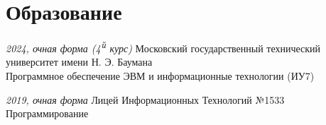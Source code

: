 \section*{Образование}

\aside
{\textit{2024, очная форма (4\textsuperscript{\,й} курс)}}
{Московский государственный технический университет имени Н. Э. Баумана\\Программное обеспечение ЭВМ и информационные технологии (ИУ7)}

\aside
{\textit{2019, очная форма}}
{Лицей Информационных Технологий №1533\\Программирование}